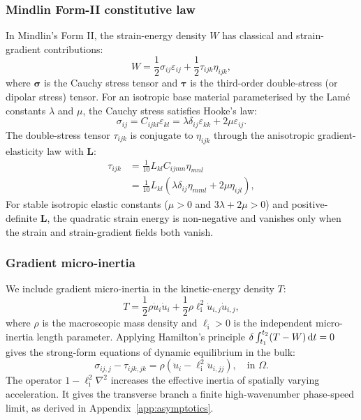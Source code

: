 \subsubsection{Mindlin Form-II constitutive law}
In Mindlin's Form II, the strain-energy density $W$ has classical and strain-gradient contributions:
\begin{equation}
W = \frac{1}{2}\sigma_{ij}\varepsilon_{ij} + \frac{1}{2}\tau_{ijk}\eta_{ijk},
\label{eq:strain_energy_W}
\end{equation}
where $\bm\sigma$ is the Cauchy stress tensor and $\bm\tau$ is the third-order double-stress (or dipolar stress) tensor. For an isotropic base material parameterised by the Lam\'e constants $\lambda$ and $\mu$, the Cauchy stress satisfies Hooke's law:
\begin{equation}
\sigma_{ij} = C_{ijkl}\varepsilon_{kl} = \lambda \delta_{ij}\varepsilon_{kk} + 2\mu \varepsilon_{ij}.
\label{eq:cauchy_stress}
\end{equation}
The double-stress tensor $\tau_{ijk}$ is conjugate to $\eta_{ijk}$ through the anisotropic gradient-elasticity law with $\mathbf{L}$:
\begin{equation}
\begin{split}
\tau_{ijk} &= \frac{1}{10} L_{kl} C_{ijmn}\eta_{mnl} \\
&= \frac{1}{10} L_{kl}\left(\lambda \delta_{ij}\eta_{mml} + 2\mu \eta_{ijl}\right),
\end{split}
\label{eq:double_stress}
\end{equation}
For stable isotropic elastic constants ($\mu>0$ and $3\lambda+2\mu>0$) and positive-definite $\mathbf{L}$, the quadratic strain energy is non-negative and vanishes only when the strain and strain-gradient fields both vanish.

\subsubsection{Gradient micro-inertia}
We include gradient micro-inertia in the kinetic-energy density $T$:
\begin{equation}
T = \frac{1}{2}\rho \dot u_i \dot u_i + \frac{1}{2}\rho \ell_{\mathrm{i}}^2 \dot u_{i,j}\dot u_{i,j},
\label{eq:kinetic_energy_T}
\end{equation}
where $\rho$ is the macroscopic mass density and $\ell_{\mathrm{i}} > 0$ is the independent micro-inertia length parameter. Applying Hamilton's principle $\delta \int_{t_1}^{t_2} (T - W)\,\mathrm{d} t = 0$ gives the strong-form equations of dynamic equilibrium in the bulk:
\begin{equation}
\sigma_{ij,j} - \tau_{ijk,jk} = \rho\left(\ddot u_i - \ell_{\mathrm{i}}^2 \ddot u_{i,jj}\right), \quad \text{in } \Omega.
\label{eq:strong_form}
\end{equation}
The operator $1-\ell_{\mathrm{i}}^2\nabla^2$ increases the effective inertia of spatially varying acceleration. It gives the transverse branch a finite high-wavenumber phase-speed limit, as derived in Appendix~\ref{app:asymptotics}.

